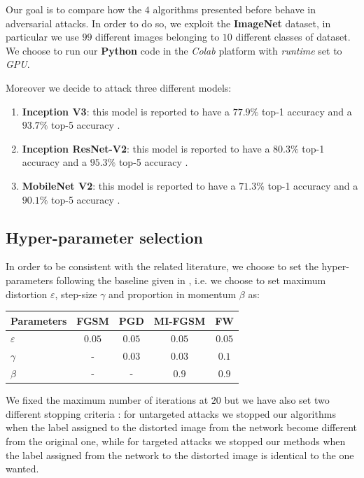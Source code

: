 \documentclass[10pt,twocolumn,letterpaper, english]{article}
\theoremstyle{definition}
\theoremstyle{plain}
\theoremstyle{plain}
\theoremstyle{plain}
\theoremstyle{plain}
\theoremstyle{remark}
\theoremstyle{remark}
\theoremstyle{definition}
\theoremstyle{definition}
\theoremstyle{definition}
\theoremstyle{definition}
\renewcommand{\epsilon}{\varepsilon}
\begin{document}
Our goal is to compare how the $4$ algorithms presented before behave in adversarial attacks. 
In order to do so, we exploit the \textbf{ImageNet} dataset, in particular we use $99$ different images belonging to $10$ different classes of dataset. 
We choose to run our \textbf{Python} code in the \textit{Colab} platform with \textit{runtime} set to \textit{GPU}.

Moreover we decide to attack three different models: 
\begin{enumerate}
    \item \textbf{Inception V3}: this model is reported to have a $77.9\%$ top-1 accuracy and a $93.7\%$ top-5 accuracy \cite{keras}.
    \item \textbf{Inception ResNet-V2}: this model is reported to have a $80.3\%$ top-1 accuracy and a	$95.3\%$ top-5 accuracy \cite{keras}.
    \item \textbf{MobileNet V2}: this model is reported to have a $71.3\%$ top-1 accuracy and a	$90.1\%$ top-5 accuracy \cite{keras}.
    
\end{enumerate}


\subsection{Hyper-parameter selection}

In order to be consistent with the related literature, we choose to set the hyper-parameters following the baseline given in \cite{frank}, i.e. we choose to set maximum distortion $\epsilon$, step-size $\gamma$ and proportion in momentum $\beta$ as:


\begin{center}
    \begin{tabular}{l|c|c|c|c}
    \hline
     Parameters & FGSM & PGD & MI-FGSM & FW \\
     \hline
     $\epsilon$ & $0.05$ & $0.05$ & $0.05$ & $0.05$  \\
     
     $\gamma$ & - & $0.03$ & $0.03$ & $0.1$ \\
     
     $\beta$ & - & - & $0.9$ & $0.9$  \\
    \hline
   \end{tabular}
\end{center}

We fixed the maximum number of iterations at $20$ but we have also set two different stopping criteria  : for untargeted attacks we stopped our algorithms when the label assigned to the distorted image from the network become different from the original one, while for targeted attacks we stopped our methods when the label assigned from the network to the distorted image is identical to the one wanted. \\
\end{document}
